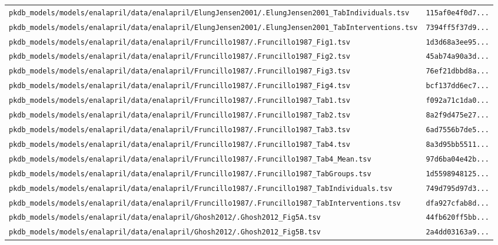 \documentclass{article}
\begin{document}
\begin{longtable}{ll}
\texttt{pkdb\_models/models/enalapril/data/enalapril/ElungJensen2001/.ElungJensen2001\_TabIndividuals.tsv} & \texttt{115af0e4f0d7...} \\
\texttt{pkdb\_models/models/enalapril/data/enalapril/ElungJensen2001/.ElungJensen2001\_TabInterventions.tsv} & \texttt{7394ff5f37d9...} \\
\texttt{pkdb\_models/models/enalapril/data/enalapril/Fruncillo1987/.Fruncillo1987\_Fig1.tsv} & \texttt{1d3d68a3ee95...} \\
\texttt{pkdb\_models/models/enalapril/data/enalapril/Fruncillo1987/.Fruncillo1987\_Fig2.tsv} & \texttt{45ab74a90a3d...} \\
\texttt{pkdb\_models/models/enalapril/data/enalapril/Fruncillo1987/.Fruncillo1987\_Fig3.tsv} & \texttt{76ef21dbbd8a...} \\
\texttt{pkdb\_models/models/enalapril/data/enalapril/Fruncillo1987/.Fruncillo1987\_Fig4.tsv} & \texttt{bcf137dd6ec7...} \\
\texttt{pkdb\_models/models/enalapril/data/enalapril/Fruncillo1987/.Fruncillo1987\_Tab1.tsv} & \texttt{f092a71c1da0...} \\
\texttt{pkdb\_models/models/enalapril/data/enalapril/Fruncillo1987/.Fruncillo1987\_Tab2.tsv} & \texttt{8a2f9d475e27...} \\
\texttt{pkdb\_models/models/enalapril/data/enalapril/Fruncillo1987/.Fruncillo1987\_Tab3.tsv} & \texttt{6ad7556b7de5...} \\
\texttt{pkdb\_models/models/enalapril/data/enalapril/Fruncillo1987/.Fruncillo1987\_Tab4.tsv} & \texttt{8a3d95bb5511...} \\
\texttt{pkdb\_models/models/enalapril/data/enalapril/Fruncillo1987/.Fruncillo1987\_Tab4\_Mean.tsv} & \texttt{97d6ba04e42b...} \\
\texttt{pkdb\_models/models/enalapril/data/enalapril/Fruncillo1987/.Fruncillo1987\_TabGroups.tsv} & \texttt{1d5598948125...} \\
\texttt{pkdb\_models/models/enalapril/data/enalapril/Fruncillo1987/.Fruncillo1987\_TabIndividuals.tsv} & \texttt{749d795d97d3...} \\
\texttt{pkdb\_models/models/enalapril/data/enalapril/Fruncillo1987/.Fruncillo1987\_TabInterventions.tsv} & \texttt{dfa927cfab8d...} \\
\texttt{pkdb\_models/models/enalapril/data/enalapril/Ghosh2012/.Ghosh2012\_Fig5A.tsv} & \texttt{44fb620ff5bb...} \\
\texttt{pkdb\_models/models/enalapril/data/enalapril/Ghosh2012/.Ghosh2012\_Fig5B.tsv} & \texttt{2a4dd03163a9...} \\

\end{longtable}
\end{document}
